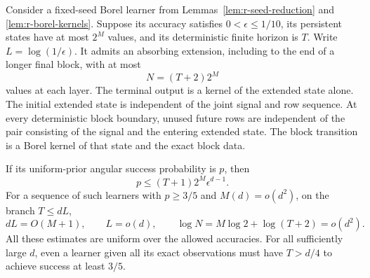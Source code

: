 \begin{lemma}
\label{lem:r-stopping-reduction}
Consider a fixed-seed Borel learner from
Lemmas~\ref{lem:r-seed-reduction} and \ref{lem:r-borel-kernels}.
Suppose its accuracy satisfies \(0<\epsilon\le1/10\), its
persistent states have at most \(2^M\) values, and its deterministic
finite horizon is \(T\).  Write
\(L=\log(1/\epsilon)\).  It admits an absorbing extension,
including to the end of a longer final block, with at most
\[
 N=(T+2)2^M
\]
values at each layer.  The terminal output is a kernel of the extended
state alone.  The initial extended state is independent of the joint
signal and row sequence.  At every deterministic block boundary,
unused future rows are independent of the pair consisting of the
signal and the entering extended state.  The block transition is a
Borel kernel of that state and the exact block data.

If its uniform-prior angular success probability is \(p\), then
\begin{equation}\label{eq:r-common-output-capacity}
 p\le (T+1)2^M\epsilon^{d-1}.
\end{equation}
For a sequence of such learners with \(p\ge3/5\) and
\(M(d)=o(d^2)\), on the branch \(T\le dL\),
\begin{equation}\label{eq:r-common-clock}
 dL=O(M+1),\qquad L=o(d),\qquad
 \log N=M\log2+\log(T+2)=o(d^2).
\end{equation}
All these estimates are uniform over the allowed accuracies.
For all sufficiently large \(d\), even a learner given all its exact
observations must have \(T>d/4\) to achieve success at least \(3/5\).
\end{lemma}

